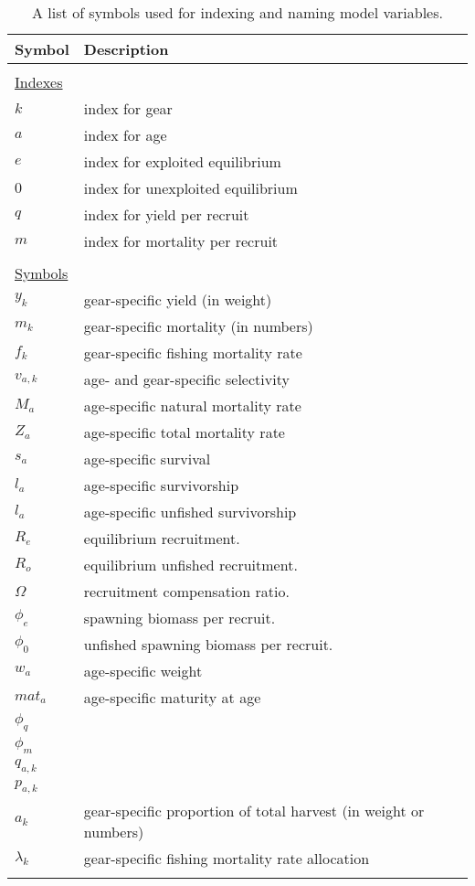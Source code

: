 \documentclass[12pt,letterpaper]{article}
\begin{document}
\begin{longtable}{ll}

\caption[index symbols]{A list of symbols used for indexing and naming model variables.} 
\label{tab:list_of_symbols} \tabularnewline

\hline 
\multicolumn{1}{l}{\textbf{Symbol}} & 
\multicolumn{1}{l}{\textbf{Description}} \\
\hline\\[-2ex]
\endfirsthead

\multicolumn{2}{l}{\underline{Indexes}}\\
$k$  & index for gear  \\      
$a$  & index for age \\      
$e$  & index for exploited equilibrium  \\      
$0$  & index for unexploited equilibrium \\ 
$q$  & index for yield per recruit \\
$m$  & index for mortality per recruit \\
\hline\\[-2ex]
\multicolumn{2}{l}{\underline{Symbols}}\\
$y_{k}$ 			& gear-specific yield (in weight)\\
$m_{k}$ 			& gear-specific mortality (in numbers)\\
$f_{k}$ 			& gear-specific fishing mortality rate\\
$v_{a,k}$ 			& age- and gear-specific selectivity\\
$M_{a}$ 			& age-specific natural mortality rate \\
$Z_{a}$ 			& age-specific total mortality rate \\
$s_{a}$ 			& age-specific survival \\
$l_{a}$ 			& age-specific survivorship \\
$l_{a}$ 			& age-specific unfished survivorship \\
$R_e$     			& equilibrium recruitment.\\
$R_o$  	 			& equilibrium unfished recruitment.\\
$\Omega$			& recruitment compensation ratio.\\
$\phi_{e} $     	& spawning biomass per recruit.\\
$\phi_{0} $     	& unfished spawning biomass per recruit.\\
$w_{a}$ 			& age-specific weight \\
$mat_a$ 			& age-specific maturity at age \\
$\phi_{q}$ 			& \\
$\phi_{m}$ 			& \\
$q_{a,k}$ 			& \\
$p_{a,k}$ 			& \\
$a_k$ 				& gear-specific proportion of total harvest (in weight or numbers)\\
$\lambda_{k}$ 		& gear-specific fishing mortality rate allocation\\
\hline\\[-2ex]
\end{longtable}
\end{document}
